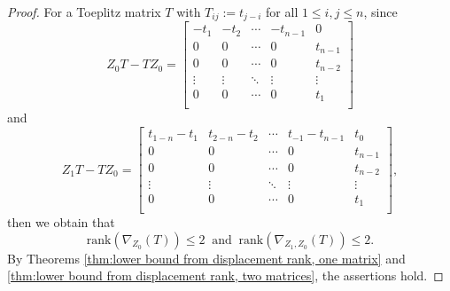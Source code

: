 \documentclass[10pt,a4paper]{amsart}
\newcommand{\rank}{\mathrm{rank}}
\begin{document}
\begin{proof}
    For a Toeplitz matrix $T$ with $T_{ij}:=t_{j-i}$ for all $1 \le i,j \leq n$, since
    \begin{equation*}
        Z_0T-TZ_0=\begin{bmatrix}
            -t_1 & -t_2 & \cdots & -t_{n-1} & 0\\
            0 & 0 & \cdots & 0 & t_{n-1}\\
            0 & 0 & \cdots & 0 & t_{n-2}\\
            \vdots & \vdots &\ddots & \vdots & \vdots\\
            0 & 0 & \cdots & 0 & t_{1}\\
        \end{bmatrix}
    \end{equation*}
    and 
    \begin{equation*}
        Z_1T-TZ_0=\begin{bmatrix}
            t_{1-n}-t_{1} & t_{2-n}-t_2 & \cdots & t_{-1}-t_{n-1} & t_0\\
            0 & 0 & \cdots & 0 & t_{n-1}\\
            0 & 0 & \cdots & 0 & t_{n-2}\\
            \vdots & \vdots &\ddots & \vdots & \vdots\\
            0 & 0 & \cdots & 0 & t_{1}\\
        \end{bmatrix},
    \end{equation*}
    then we obtain that
    \begin{equation*}
        \rank(\nabla_{Z_0}(T)) \leq 2~\text{ and }~\rank(\nabla_{Z_1,Z_0}(T)) \leq 2.
    \end{equation*}
    By Theorems \ref{thm:lower bound from displacement rank, one matrix} and \ref{thm:lower bound from displacement rank, two matrices}, the assertions hold.
\end{proof}
\end{document}
